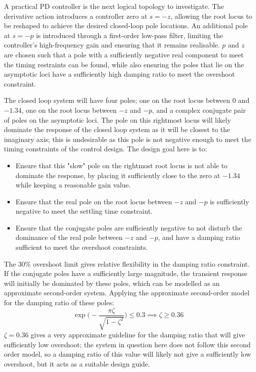 \documentclass[conference,onecolumn,a4paper,11pt]{IEEEtran}
\begin{document}
A practical PD controller is the next logical topology to investigate. The derivative action introduces a controller zero at $s=-z$, allowing the root locus to be reshaped to achieve the desired closed-loop pole locations. An additional pole at $s=-p$ is introduced through a first-order low-pass filter, limiting the controller's high-frequency gain and ensuring that it remains realisable. $p$ and $z$ are chosen such that a pole with a sufficiently negative real component to meet the timing restraints can be found, while also ensuring the poles that lie on the asymptotic loci have a sufficiently high damping ratio to meet the overshoot constraint.

The closed loop system will have four poles; one on the root locus between $0$ and $-1.34$, one on the root locus between $-z$ and $-p$, and a complex conjugate pair of poles on the asymptotic loci. The pole on this rightmost locus will likely dominate the response of the closed loop system as it will be closest to the imaginary axis; this is undesirable as this pole is not negative enough to meet the timing constraints of the control design. The design goal here is to:
\begin{itemize}
    \item Ensure that this "slow" pole on the rightmost root locus is not able to dominate the response, by placing it sufficiently close to the zero at $-1.34$ while keeping a reasonable gain value.
    \item Ensure that the real pole on the root locus between $-z$ and $-p$ is sufficiently negative to meet the settling time constraint.
    \item Ensure that the conjugate poles are sufficiently negative to not disturb the dominance of the real pole between $-z$ and $-p$, and have a damping ratio sufficient to meet the overshoot constraints. 
\end{itemize}
The 30\% overshoot limit gives relative flexibility in the damping ratio constraint. If the conjugate poles have a sufficiently large magnitude, the transient response will initially be dominated by these poles, which can be modelled as an approximate second-order system. Applying the approximate second-order model for the damping ratio of these poles:
$$
\exp \big(-\frac{\pi \zeta}{\sqrt{1 - \zeta^2}} \big ) \le 0.3 \implies \zeta \ge 0.36 
$$
$\zeta=0.36$ gives a very approximate guideline for the damping ratio that will give sufficiently low overshoot; the system in question here does not follow this second order model, so a damping ratio of this value will likely not give a sufficiently low overshoot, but it acts as a suitable design guide. 
\end{document}
